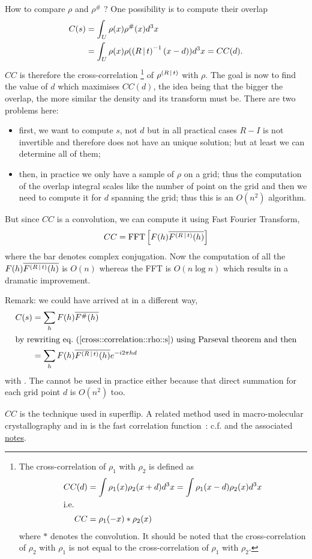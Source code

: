 \documentclass[11pt]{article}
\begin{document}
How to compare $\rho$ and $\rho^\#$ ? One possibility is to compute their overlap
\begin{align}
C(s) &= \int_U \rho(x) \rho^\#(x) d^3x  \label{cross::correlation::rho::s}\\
&= \int_U \rho(x) \rho(\left( R\,\vert\, t \right)^{-1}(x - d))d^3x = CC(d). \label{cross::correlation::rho::d}
\end{align}
$CC$ is therefore the cross-correlation%
\footnote{The cross-correlation of $\rho_1$ with $\rho_2$ is defined as
\begin{align}
CC(d) &= \int \rho_1(x) \rho_2(x+d)d^3x = \int \rho_1(x-d) \rho_2(x) d^3x \\
\intertext{i.e.}
CC &= \rho_1(-x) * \rho_2(x)
\end{align}
where $*$ denotes the convolution. It should be noted that the cross-correlation of $\rho_2$ with $\rho_1$ is not equal to the cross-correlation of $\rho_1$ with $\rho_2$.} 
of $\rho^{\left( R\,\vert\, t \right)}$ with $\rho$.
The goal is now to find the value of $d$ which maximises $CC(d)$, the idea being that the bigger the overlap, the more similar the density and its transform must be. There are two problems here:
\begin{itemize}
\item first, we want to compute $s$, not $d$ but in all practical cases $R-I$ is not invertible and therefore  does not have an unique solution; but at least we can determine all of them;
\item then, in practice we only have a sample of $\rho$ on a grid; thus the computation of the overlap integral scales like the number of point on the grid and then we need to compute it for $d$ spanning the grid; thus this is an $O(n^2)$ algorithm.
\end{itemize}
But since $CC$ is a convolution, we can compute it using Fast Fourier Transform,
\newcommand{\tmp}{F(h)\overline{F^{\sym{R}{t}}(h)}}
\begin{equation}
CC = \fourier{\tmp}\label{CC:as::FFT}
\end{equation}
where the bar denotes complex conjugation. Now the computation of all the $\tmp$ is $O(n)$ whereas the FFT is $O(n\log n)$ which results in a dramatic improvement.

Remark: we could have arrived at  in a different way,
\begin{align}
C(s) &= \sum_h F(h)\overline{F^\#(h)} \label{cross::correlation::F}\\
\intertext{by rewriting \refeq{cross::correlation::rho::s} using Parseval theorem and then}
&= \sum_h F(h) \overline{F^{\sym{R}{t}}(h)} e^{-i2\pi hd}
\end{align}
with . The  cannot be used in practice either because that direct summation for each grid point $d$ is $O(n^2)$ too.

$CC$ is the technique used in superflip. A related method used in macro-molecular crystallography and in  is the fast correlation function~\cite{J.Navaza:1995}: c.f.  and the associated \href{file://../translation_search/notes.pdf}{notes}.


\end{document}
